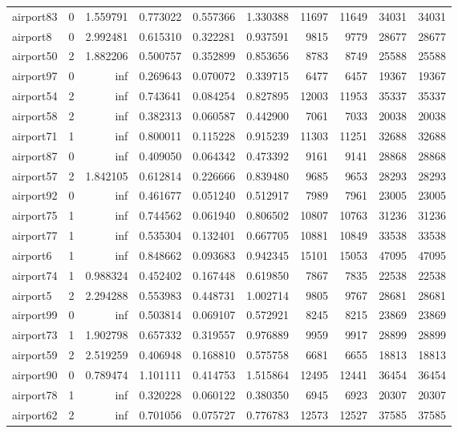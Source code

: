 \begin{longtable}{|l|r|r|r|r|r|r|r|r|r|}
airport83 & 0 & 1.559791 & 0.773022 & 0.557366 & 1.330388 & 11697 & 11649 & 34031 & 34031 \\
airport8 & 0 & 2.992481 & 0.615310 & 0.322281 & 0.937591 & 9815 & 9779 & 28677 & 28677 \\
airport50 & 2 & 1.882206 & 0.500757 & 0.352899 & 0.853656 & 8783 & 8749 & 25588 & 25588 \\
airport97 & 0 & inf & 0.269643 & 0.070072 & 0.339715 & 6477 & 6457 & 19367 & 19367 \\
airport54 & 2 & inf & 0.743641 & 0.084254 & 0.827895 & 12003 & 11953 & 35337 & 35337 \\
airport58 & 2 & inf & 0.382313 & 0.060587 & 0.442900 & 7061 & 7033 & 20038 & 20038 \\
airport71 & 1 & inf & 0.800011 & 0.115228 & 0.915239 & 11303 & 11251 & 32688 & 32688 \\
airport87 & 0 & inf & 0.409050 & 0.064342 & 0.473392 & 9161 & 9141 & 28868 & 28868 \\
airport57 & 2 & 1.842105 & 0.612814 & 0.226666 & 0.839480 & 9685 & 9653 & 28293 & 28293 \\
airport92 & 0 & inf & 0.461677 & 0.051240 & 0.512917 & 7989 & 7961 & 23005 & 23005 \\
airport75 & 1 & inf & 0.744562 & 0.061940 & 0.806502 & 10807 & 10763 & 31236 & 31236 \\
airport77 & 1 & inf & 0.535304 & 0.132401 & 0.667705 & 10881 & 10849 & 33538 & 33538 \\
airport6 & 1 & inf & 0.848662 & 0.093683 & 0.942345 & 15101 & 15053 & 47095 & 47095 \\
airport74 & 1 & 0.988324 & 0.452402 & 0.167448 & 0.619850 & 7867 & 7835 & 22538 & 22538 \\
airport5 & 2 & 2.294288 & 0.553983 & 0.448731 & 1.002714 & 9805 & 9767 & 28681 & 28681 \\
airport99 & 0 & inf & 0.503814 & 0.069107 & 0.572921 & 8245 & 8215 & 23869 & 23869 \\
airport73 & 1 & 1.902798 & 0.657332 & 0.319557 & 0.976889 & 9959 & 9917 & 28899 & 28899 \\
airport59 & 2 & 2.519259 & 0.406948 & 0.168810 & 0.575758 & 6681 & 6655 & 18813 & 18813 \\
airport90 & 0 & 0.789474 & 1.101111 & 0.414753 & 1.515864 & 12495 & 12441 & 36454 & 36454 \\
airport78 & 1 & inf & 0.320228 & 0.060122 & 0.380350 & 6945 & 6923 & 20307 & 20307 \\
airport62 & 2 & inf & 0.701056 & 0.075727 & 0.776783 & 12573 & 12527 & 37585 & 37585 \\

\end{longtable}

